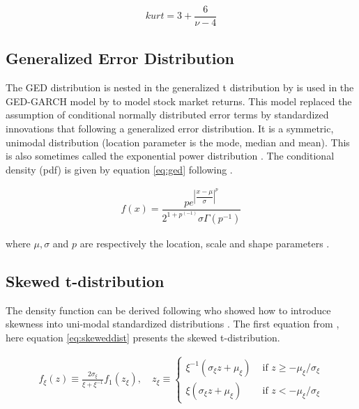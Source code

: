 \documentclass[a4paper, twoside]{templates/ociamthesis}
\begin{document}
\begin{align}
kurt = 3 + \dfrac{6}{\nu-4}
 \label{eq:kurt}
\end{align}

\hypertarget{generalized-error-distribution}{%
\subsection{Generalized Error Distribution}\label{generalized-error-distribution}}

\noindent The GED distribution is nested in the generalized t distribution by \textcite{mcdonald1988} is used in the GED-GARCH model by \textcite{nelson1991} to model stock market returns. This model replaced the assumption of conditional normally distributed error terms by standardized innovations that following a generalized error distribution. It is a symmetric, unimodal distribution (location parameter is the mode, median and mean). This is also sometimes called the exponential power distribution \autocite{bollerslev2008}. The conditional density (pdf) is given by equation \eqref{eq:ged} following \textcite{ghalanos2020}.

\begin{align}
f(x) = \dfrac{p e^{\left|\dfrac{x-\mu}{\sigma}\right|^p}}{2^{1+p^(-1)}\sigma\Gamma(p^{-1})}
 \label{eq:ged}
\end{align}

where \(\mu, \sigma\) and \(p\) are respectively the location, scale and shape parameters .

\hypertarget{skewed-t-distribution}{%
\subsection{Skewed t-distribution}\label{skewed-t-distribution}}

\noindent The density function can be derived following \textcite{fernández1998} who showed how to introduce skewness into uni-modal standardized distributions \autocite{trottier2015}. The first equation from \textcite{trottier2015}, here equation \eqref{eq:skeweddist} presents the skewed t-distribution.

\begin{align}
f_{\xi}(z) \equiv \frac{2 \sigma_{\xi}}{\xi+\xi^{-1}} f_{1}\left(z_{\xi}\right), \quad z_{\xi} \equiv\left\{\begin{array}{ll}
\xi^{-1}\left(\sigma_{\xi} z+\mu_{\xi}\right) & \text { if } z \geq-\mu_{\xi} / \sigma_{\xi} \\
\xi\left(\sigma_{\xi} z+\mu_{\xi}\right) & \text { if } z<-\mu_{\xi} / \sigma_{\xi}
\end{array}\right.
 \label{eq:skeweddist}
\end{align}
\end{document}
